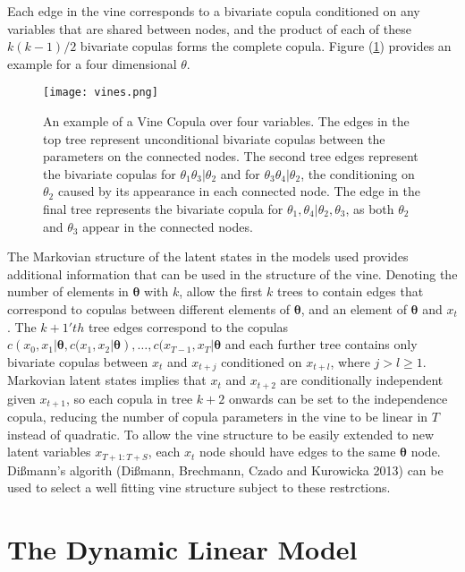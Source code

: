 \documentclass[12pt,a4paper]{article}%
\numberwithin{equation}{section}
\begin{document}
Each edge in the vine corresponds to a bivariate copula conditioned on any variables that are shared between nodes, and the product of each of these $k(k-1)/2$ bivariate copulas forms the complete copula. Figure (\ref{fig:vinecop}) provides an example for a four dimensional $\theta$.
\begin{figure}[h]
\centering
\texttt{[image: vines.png]}
\vspace{2mm}
\caption{An example of a Vine Copula over four variables. The edges in the top tree represent unconditional bivariate copulas between the parameters on the connected nodes. The second tree edges represent the bivariate copulas for $\theta_1 \theta_3 | \theta_2$ and for $\theta_3 \theta_4 | \theta_2$, the conditioning on $\theta_2$ caused by its appearance in each connected node. The edge in the final tree represents the bivariate copula for $\theta_1, \theta_4 | \theta_2, \theta_3$, as both $\theta_2$ and $\theta_3$ appear in the connected nodes.}
\label{fig:vinecop}
\end{figure}

The Markovian structure of the latent states in the models used provides additional information that can be used in the structure of the vine. Denoting the number of elements in $\boldsymbol{\theta}$ with $k$, allow the first $k$ trees to contain edges that correspond to copulas between different elements of $\boldsymbol{\theta}$, and an element of $\boldsymbol{\theta}$ and $x_t$. The $k+1'th$ tree edges correspond to the copulas $c(x_0, x_1 | \boldsymbol{\theta}, c(x_1, x_2 | \boldsymbol{\theta}), \dots, c(x_{T-1}, x_T | \boldsymbol{\theta}$ and each further tree contains only bivariate copulas between $x_t$ and $x_{t+j}$ conditioned on $x_{t+l}$, where $j > l \geq 1$. Markovian latent states implies that $x_t$ and $x_{t+2}$ are conditionally independent given $x_{t+1}$, so each copula in tree $k+2$ onwards can be set to the independence copula, reducing the number of copula parameters in the vine to be linear in $T$ instead of quadratic. To allow the vine structure to be easily extended to new latent variables $x_{T+1:T+S}$, each $x_t$ node should have edges to the same $\boldsymbol{\theta}$ node. Di{\ss}mann's algorith (Di{\ss}mann, Brechmann, Czado and Kurowicka 2013) can be used to select a well fitting vine structure subject to these restrctions. 

\section{The Dynamic Linear Model}
\end{document}
